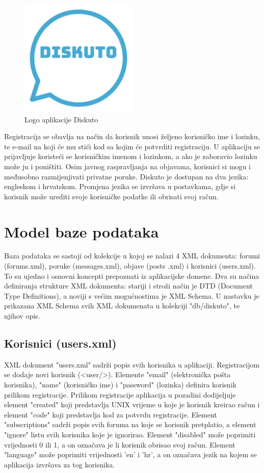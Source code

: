 \documentclass{foi}
\begin{document}
\begin{figure}[h!]
    \centering
    \includegraphics[width=0.5\textwidth]{slike/logo.png}
    \caption{Logo aplikacije Diskuto}
\end{figure}

Registracija se obavlja na način da korisnik unosi željeno korisničko ime i lozinku, te e-mail na koji će mu stići kod sa kojim će potvrditi registraciju. U aplikaciju se prijavljuje koristeći se korisničkim imenom i lozinkom, a ako je zaboravio lozinku može ju i poništiti. Osim javnog raspravljanja na objavama, korisnici si mogu i međusobno razmijenjivati privatne poruke. Diskuto je dostupan na dva jezika: engleskom i hrvatskom. Promjena jezika se izvršava u postavkama, gdje si korisnik može urediti svoje korisničke podatke ili obrisati svoj račun.

\chapter{Model baze podataka}

Baza podataka se sastoji od kolekcije u kojoj se nalazi 4 XML dokumenta: forumi (forums.xml), poruke (messages.xml), objave (posts .xml) i korisnici (users.xml). To su ujedno i osnovni koncepti prepoznati iz aplikacijske domene. Dva su načina definiranja strukture XML dokumenta: stariji i stroži način je DTD (Document Type Definitions), a noviji s većim mogućnostima je XML Schema. U nastavku je prikazana XML Schema svih XML dokumenata u kolekciji "db/diskuto", te njihov opis.

\section{Korisnici (users.xml)}

XML dokument "users.xml" sadrži popis svih korisnika u aplikaciji. Registracijom se dodaje novi korisnik (<user/>). Elemente "email" (elektronička pošta korisnika), "name" (korisničko ime) i "password" (lozinka) definira korisnik prilikom registracije. Prilikom registracije aplikacija u pozadini dodijeljuje element "created" koji predstavlja UNIX vrijeme u koje je korisnik kreirao račun i element "code" koji predstavlja kod za potvrdu registracije. Element "subscriptions" sadrži popis svih foruma na koje se korisnik pretplatio, a element "ignore" listu svih korisnika koje je ignorirao. Element "disabled" može poprimiti vrijednosti 0 ili 1, a on označava je li korisnik obrisao svoj račun. Element "language" može poprimiti vrijednosti 'en' i 'hr', a on označava jezik na kojem se aplikacija izvršava za tog korisnika.
\end{document}
